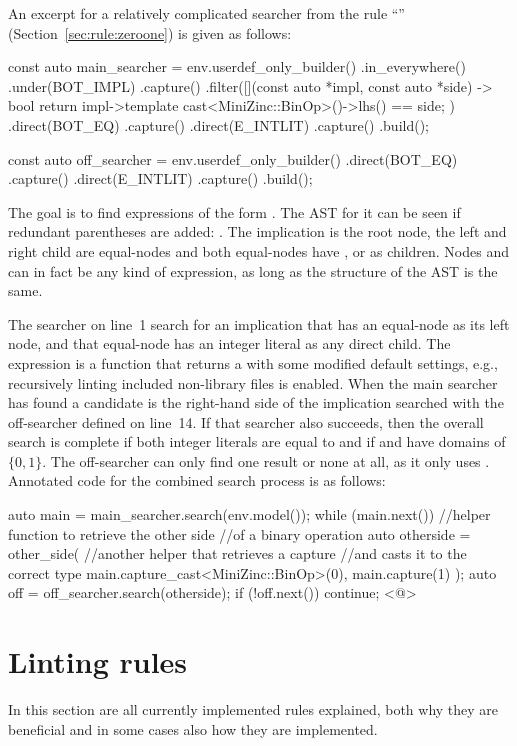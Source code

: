 \documentclass[a4paper,12pt]{article}
\newcommand{\ruleref}[1]{``\nameref{sec:rule:#1}'' (Section~\ref{sec:rule:#1})}
\begin{document}
An excerpt for a relatively complicated searcher from the rule \ruleref{zeroone} is given
as follows:
\begin{cppp}
const auto main_searcher = env.userdef_only_builder()
  .in_everywhere()
  .under(BOT_IMPL)
  .capture()
  .filter([](const auto *impl, const auto *side) -> bool {
    return impl->template cast<MiniZinc::BinOp>()->lhs() == side;
  })
  .direct(BOT_EQ)
  .capture()
  .direct(E_INTLIT)
  .capture()
  .build();

const auto off_searcher = env.userdef_only_builder()
  .direct(BOT_EQ)
  .capture()
  .direct(E_INTLIT)
  .capture()
  .build();
\end{cppp}

The goal is to find expressions of the form .
The AST for it can be seen if redundant parentheses are added: .
The implication is the root node, the left and right child are equal-nodes and both
equal-nodes have ,  or  as children. Nodes  and  can in fact be
any kind of expression, as long as the structure of the AST is the same.

The searcher on line~1 search for an implication that has an equal-node as its left node,
and that equal-node has an integer literal as any direct child. The expression
 is a function that returns a  with some
modified default settings, e.g., recursively linting included non-library files is enabled.
When the main searcher has found a candidate is the right-hand side of the implication
searched with the off-searcher defined on line~14. If that searcher also succeeds, then the
overall search is complete if both integer literals are equal to  and if  and
 have domains of $\{0,1\}$. The off-searcher can only find one result or none at
all, as it only uses . Annotated code for the combined search process is as follows:
\begin{cppp}
auto main = main_searcher.search(env.model());
while (main.next()) {
  //helper function to retrieve the other side
  //of a binary operation
  auto otherside = other_side(
    //another helper that retrieves a capture
    //and casts it to the correct type
    main.capture_cast<MiniZinc::BinOp>(0),
    main.capture(1)
    );
  auto off = off_searcher.search(otherside);
  if (!off.next())
    continue;
  <@\vdots@>
}
\end{cppp}

\section{Linting rules}\label{sec:rules}
In this section are all currently implemented rules explained, both why they are beneficial
and in some cases also how they are implemented.
\end{document}
